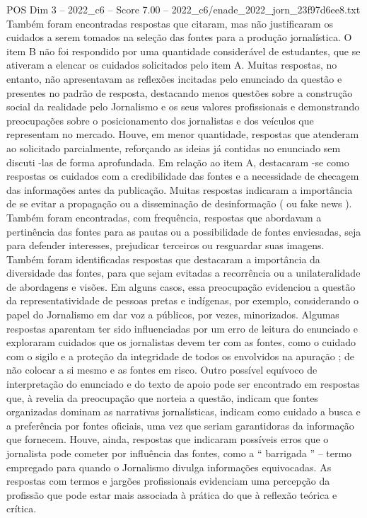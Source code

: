 \begin{textsample}{POS Dim 3 – 2022\_c6 – Score 7.00 – 2022\_c6/enade\_2022\_jorn\_23f97d6ee8.txt}
Também foram encontradas respostas que citaram, mas não justificaram os cuidados a serem tomados na seleção das fontes para a produção jornalística.
O item B não foi respondido por uma quantidade considerável de estudantes, que se ativeram a elencar os cuidados solicitados pelo item A.
Muitas respostas, no entanto, não apresentavam as reflexões incitadas pelo enunciado da questão e presentes no padrão de resposta, destacando menos questões sobre a construção social da realidade pelo Jornalismo e os seus valores profissionais e demonstrando preocupações sobre o posicionamento dos jornalistas e dos veículos que representam no mercado.
Houve, em menor quantidade, respostas que atenderam ao solicitado parcialmente, reforçando as ideias já contidas no enunciado sem discuti -las de forma aprofundada.
Em relação ao item A, destacaram -se como respostas os cuidados com a credibilidade das fontes e a necessidade de checagem das informações antes da publicação.
Muitas respostas indicaram a importância de se evitar a propagação ou a disseminação de desinformação ( ou fake news ).
Também foram encontradas, com frequência, respostas que abordavam a pertinência das fontes para as pautas ou a possibilidade de fontes enviesadas, seja para defender interesses, prejudicar terceiros ou resguardar suas imagens.
Também foram identificadas respostas que destacaram a importância da diversidade das fontes, para que sejam evitadas a recorrência ou a unilateralidade de abordagens e visões.
Em alguns casos, essa preocupação evidenciou a questão da representatividade de pessoas pretas e indígenas, por exemplo, considerando o papel do Jornalismo em dar voz a públicos, por vezes, minorizados.
Algumas respostas aparentam ter sido influenciadas por um erro de leitura do enunciado e exploraram cuidados que os jornalistas devem ter com as fontes, como o cuidado com o sigilo e a proteção da integridade de todos os envolvidos na apuração ; de não colocar a si mesmo e as fontes em risco.
Outro possível equívoco de interpretação do enunciado e do texto de apoio pode ser encontrado em respostas que, à revelia da preocupação que norteia a questão, indicam que fontes organizadas dominam as narrativas jornalísticas, indicam como cuidado a busca e a preferência por fontes oficiais, uma vez que seriam garantidoras da informação que fornecem.
Houve, ainda, respostas que indicaram possíveis erros que o jornalista pode cometer por influência das fontes, como a “ barrigada ” – termo empregado para quando o Jornalismo divulga informações equivocadas.
As respostas com termos e jargões profissionais evidenciam uma percepção da profissão que pode estar mais associada à prática do que à reflexão teórica e crítica.

\end{textsample}

